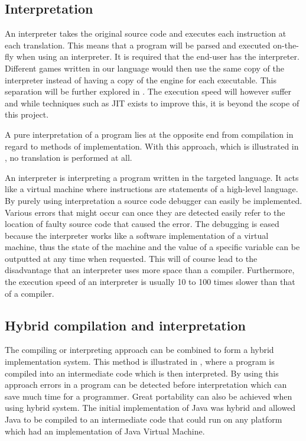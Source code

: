 \subsection{Interpretation}
\label{sec:interpretation}
An interpreter takes the original source code and executes each instruction at
each translation. This means that a program will be parsed and executed
on-the-fly when using an interpreter. It is required that the end-user has the
interpreter. Different games written in our language would then use the same
copy of the interpreter instead of having a copy of the engine for each
executable. This separation will be further explored in
. The execution speed will however suffer and
while techniques such as JIT exists to improve this, it is beyond the scope of
this project.

A pure interpretation of a program lies at the opposite end from compilation in
regard to methods of implementation. With this approach, which is illustrated in
, no translation is performed at all.



An interpreter is interpreting a program written in the targeted language. It
acts like a virtual machine where instructions are statements of a high-level
language. By purely using interpretation a source code debugger can easily be
implemented. Various errors that might occur can once they are detected easily
refer to the location of faulty source code that caused the error. The debugging is
eased because the interpreter works like a software implementation of a virtual
machine, thus the state of the machine and the value of a specific variable can
be outputted at any time when requested. This will of course lead to the
disadvantage that an interpreter uses more space than a compiler. Furthermore,
the execution speed of an interpreter is usually 10 to 100 times slower than
that of a compiler.
\cite[p. 48]{sebesta2013}

\subsection{Hybrid compilation and interpretation}
The compiling or interpreting approach can be combined to form a hybrid
implementation system. This method is illustrated in
, where a program is compiled into an
intermediate code which is then interpreted. By using this approach errors in a
program can be detected before interpretation which can save much time for a
programmer. Great portability can also be achieved when using hybrid system.
The initial implementation of Java was hybrid and allowed Java to be compiled to
an intermediate code that could run on any platform which had an implementation
of Java Virtual Machine.
\cite[p. 50]{sebesta2013}

